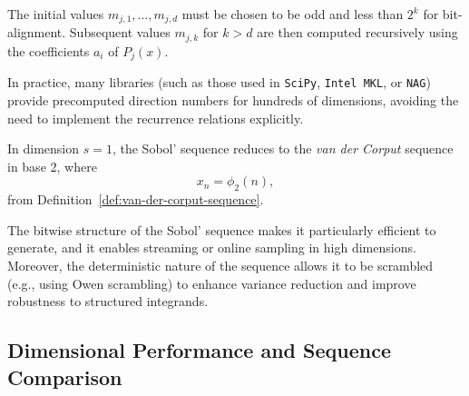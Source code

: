 The initial values $m_{j,1}, \dots, m_{j,d}$ must be chosen to be odd and less than $2^k$ for bit-alignment. Subsequent values $m_{j,k}$ for $k > d$ are then computed recursively using the coefficients $a_i$ of $P_j(x)$.

\begin{remark}
In practice, many libraries (such as those used in \texttt{SciPy}, \texttt{Intel MKL}, or \texttt{NAG}) provide precomputed direction numbers for hundreds of dimensions, avoiding the need to implement the recurrence relations explicitly.
\end{remark}

\begin{example}
In dimension $s = 1$, the Sobol' sequence reduces to the \emph{van der Corput} sequence in base 2, where
\begin{equation*}
  x_n = \phi_2(n),
\end{equation*}
from Definition~\ref{def:van-der-corput-sequence}.
\end{example}

The bitwise structure of the Sobol' sequence makes it particularly efficient to generate, and it enables streaming or online sampling in high dimensions. Moreover, the deterministic nature of the sequence allows it to be scrambled (e.g., using Owen scrambling) to enhance variance reduction and improve robustness to structured integrands.






  \subsection{Dimensional Performance and Sequence Comparison}
